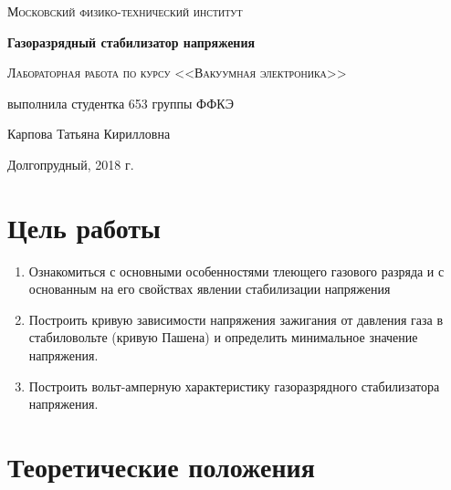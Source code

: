 \documentclass[a4paper]{article}
\begin{document}
\begin{titlepage}
	\centering
	\vspace{5cm}
	{\scshape\LARGE Московский физико-технический институт \par}
	\vspace{5cm}

	{\huge\bfseries Газоразрядный стабилизатор напряжения \par}
	\vspace{1cm}
	{\scshape\Large Лабораторная работа по курсу <<Вакуумная электроника>>\par}
	\vspace{1cm}
	\vfill
\begin{flushright}
	{\large выполнила студентка 653 группы ФФКЭ}\par
	\vspace{0.3cm}
	{\LARGE Карпова Татьяна Кирилловна} \par

	
\end{flushright}
	

	\vfill

	Долгопрудный, 2018 г.
\end{titlepage}

\section{Цель работы}
\begin{enumerate}
    \item Ознакомиться с основными особенностями тлеющего газового разряда и с основанным на его свойствах явлении стабилизации напряжения
\item Построить кривую зависимости напряжения зажигания от давления газа в стабиловольте (кривую Пашена) и определить минимальное значение напряжения.
\item Построить вольт-амперную характеристику газоразрядного стабилизатора напряжения.

\end{enumerate}

\section{Теоретические положения}
\end{document}
